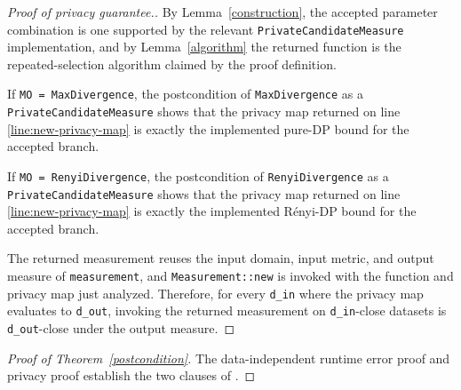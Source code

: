 \documentclass{article}
\begin{document}
\begin{proof}[Proof of privacy guarantee.]
By Lemma~\ref{construction}, the accepted parameter combination is one supported by the relevant
\texttt{PrivateCandidateMeasure} implementation, and by Lemma~\ref{algorithm} the returned
function is the repeated-selection algorithm claimed by the proof definition.

If \texttt{MO = MaxDivergence}, the postcondition of
\texttt{MaxDivergence} as a \texttt{PrivateCandidateMeasure} shows that the privacy map returned on
line \ref{line:new-privacy-map} is exactly the implemented pure-DP bound for the accepted branch.

If \texttt{MO = RenyiDivergence}, the postcondition of
\texttt{RenyiDivergence} as a \texttt{PrivateCandidateMeasure} shows that the privacy map returned
on line \ref{line:new-privacy-map} is exactly the implemented Rényi-DP bound for the accepted
branch.

The returned measurement reuses the input domain, input metric, and output measure of
\texttt{measurement}, and \texttt{Measurement::new} is invoked with the function and privacy map
just analyzed. Therefore, for every \texttt{d\_in} where the privacy map evaluates to
\texttt{d\_out}, invoking the returned measurement on \texttt{d\_in}-close datasets is
\texttt{d\_out}-close under the output measure.
\end{proof}

\begin{proof}[Proof of Theorem~\ref{postcondition}]
The data-independent runtime error proof and privacy proof establish the two clauses of
.
\end{proof}
\end{document}
